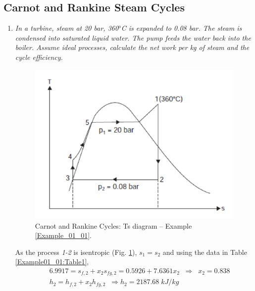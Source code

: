 
\pagebreak

\subsection{Carnot and Rankine Steam Cycles}


\begin{enumerate}

\item {\it In a turbine, steam at 20 bar, 360$^{o}$C is expanded to 0.08 bar. The steam is condensed into saturated liquid water. The pump feeds the water back into the boiler. Assume ideal processes, calculate the net work per kg of steam and the cycle efficiency.}\label{Example_01_01}

\begin{figure}[h]
\begin{center}
\includegraphics[width=13.0cm,height=8.0cm]{./Pics/example01_01}
\end{center}
\caption{Carnot and Rankine Cycles: Ts diagram -- Example \ref{Example_01_01}.}
\label{Example01_01:Pic1}
\end{figure}

As the process {\it 1-2} is isentropic (Fig. \ref{Example01_01:Pic1}), $s_{1}=s_{2}$ and using the data in Table \ref{Example01_01:Table1},
\begin{eqnarray}
&& 6.9917 = s_{f,2}+x_{2}s_{fg,2} = 0.5926 + 7.6361 x_{2} \;\; \Longrightarrow \;\; x_{2}= 0.838 \nonumber \\
&& h_{2} = h_{f,2}+ x_{2}h_{fg,2} \;\; \Longrightarrow h_{2}=2187.68\;kJ/kg \nonumber
\end{eqnarray}


\end{enumerate}
